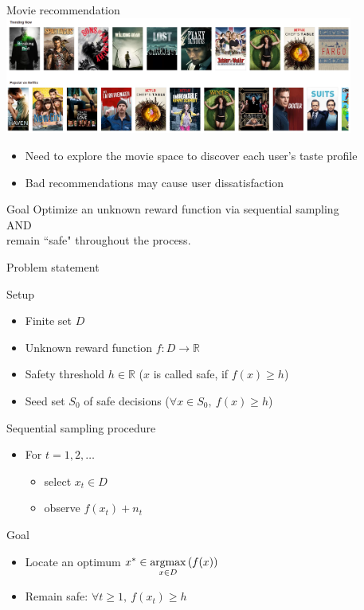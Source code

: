 \documentclass[10pt,mathserif]{beamer}
\begin{document}
\begin{frame}{Movie recommendation}
\centering
\includegraphics[width=4.5in]{figures/netflix.png}
\vspace{2em}
\begin{itemize}
\item Need to explore the movie space to discover each user's taste profile
\item Bad recommendations may cause user dissatisfaction
\end{itemize}
\end{frame}

\begin{frame}{Goal}
\centering
\large
Optimize an unknown reward function via sequential sampling\\[1em]
AND\\[1em]
remain ``safe" throughout the process.
\end{frame}

\begin{frame}{Problem statement}

{\large Setup}
\begin{itemize}
\item Finite set $D$
\item Unknown reward function $f : D \to \mathbb{R}$
\item Safety threshold $h \in \mathbb{R}$ ($x$ is called safe, if $f(x) \geq h$)
\item Seed set $S_0$ of safe decisions ($\forall x \in S_0,\ f(x) \geq h$)
\end{itemize}
\vspace{1em}
{\large Sequential sampling procedure}
\begin{itemize}
\item For $t = 1, 2, \ldots$
  \begin{itemize}
    \item select $x_t \in D$
    \item observe $f(x_t) + n_t$
  \end{itemize}
\end{itemize}
\vspace{1em}
{\large Goal}
\begin{itemize}
\item Locate an optimum $x^* \in \displaystyle\argmax_{x\in D}\left(f(x)\right)$
\item Remain safe: $\forall t \geq 1,\ f(x_t) \geq h$
\end{itemize}
\end{frame}
\end{document}
